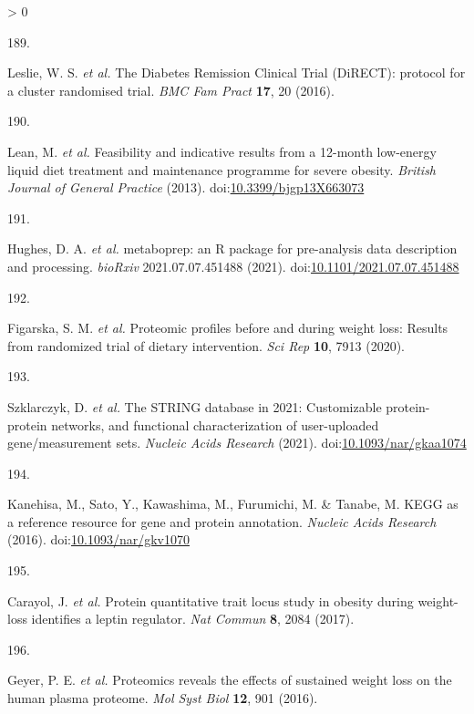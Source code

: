 \documentclass[11pt,twoside]{bristolthesis}
\newlength{\cslhangindent}
\newlength{\csllabelwidth}
\newenvironment{CSLReferences}[2] %
 {%
  \setlength{\parindent}{0pt}
  \ifodd #1 \everypar{\setlength{\hangindent}{\cslhangindent}}\ignorespaces\fi
  \ifnum #2 > 0
  \setlength{\parskip}{#2\baselineskip}
  \fi
 }%
 {}
\newcommand{\CSLLeftMargin}[1]{\parbox[t]{\csllabelwidth}{#1}}
\newcommand{\CSLRightInline}[1]{\parbox[t]{\linewidth - \csllabelwidth}{#1}\break}
\begin{document}
\begin{CSLReferences}{0}{0}
\leavevmode\hypertarget{ref-Leslie2016}{}%
\CSLLeftMargin{189. }
\CSLRightInline{Leslie, W. S. \emph{et al.} {The Diabetes Remission Clinical Trial (DiRECT): protocol for a cluster randomised trial}. \emph{BMC Fam Pract} \textbf{17}, 20 (2016).}

\leavevmode\hypertarget{ref-Lean2013}{}%
\CSLLeftMargin{190. }
\CSLRightInline{Lean, M. \emph{et al.} {Feasibility and indicative results from a 12-month low-energy liquid diet treatment and maintenance programme for severe obesity}. \emph{British Journal of General Practice} (2013). doi:\href{https://doi.org/10.3399/bjgp13X663073}{10.3399/bjgp13X663073}}

\leavevmode\hypertarget{ref-Hughes2021}{}%
\CSLLeftMargin{191. }
\CSLRightInline{Hughes, D. A. \emph{et al.} {metaboprep: an R package for pre-analysis data description and processing}. \emph{bioRxiv} 2021.07.07.451488 (2021). doi:\href{https://doi.org/10.1101/2021.07.07.451488}{10.1101/2021.07.07.451488}}

\leavevmode\hypertarget{ref-Figarska2020}{}%
\CSLLeftMargin{192. }
\CSLRightInline{Figarska, S. M. \emph{et al.} {Proteomic profiles before and during weight loss: Results from randomized trial of dietary intervention}. \emph{Sci Rep} \textbf{10}, 7913 (2020).}

\leavevmode\hypertarget{ref-Szklarczyk2021}{}%
\CSLLeftMargin{193. }
\CSLRightInline{Szklarczyk, D. \emph{et al.} {The STRING database in 2021: Customizable protein-protein networks, and functional characterization of user-uploaded gene/measurement sets}. \emph{Nucleic Acids Research} (2021). doi:\href{https://doi.org/10.1093/nar/gkaa1074}{10.1093/nar/gkaa1074}}

\leavevmode\hypertarget{ref-Kanehisa2016}{}%
\CSLLeftMargin{194. }
\CSLRightInline{Kanehisa, M., Sato, Y., Kawashima, M., Furumichi, M. \& Tanabe, M. {KEGG as a reference resource for gene and protein annotation}. \emph{Nucleic Acids Research} (2016). doi:\href{https://doi.org/10.1093/nar/gkv1070}{10.1093/nar/gkv1070}}

\leavevmode\hypertarget{ref-Carayol2017}{}%
\CSLLeftMargin{195. }
\CSLRightInline{Carayol, J. \emph{et al.} {Protein quantitative trait locus study in obesity during weight-loss identifies a leptin regulator}. \emph{Nat Commun} \textbf{8}, 2084 (2017).}

\leavevmode\hypertarget{ref-Geyer2016}{}%
\CSLLeftMargin{196. }
\CSLRightInline{Geyer, P. E. \emph{et al.} {Proteomics reveals the effects of sustained weight loss on the human plasma proteome}. \emph{Mol Syst Biol} \textbf{12}, 901 (2016).}


\end{CSLReferences}
\end{document}
